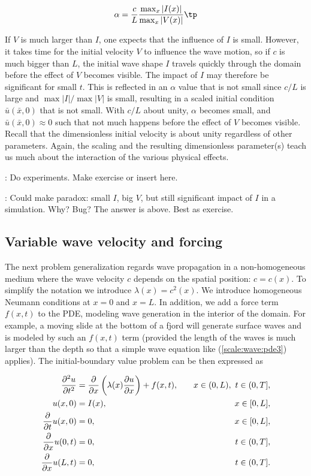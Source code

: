 \documentclass[graybox,envcountchap,sectrefs,final]{svmonodo}
\newcommand{\shortinlinecomment}[3]{{\color{red}{\bf #1}: #2}}
\newcommand{\longinlinecomment}[3]{{\color{red}{\bf #1}: #2}}
\begin{document}
\[ \alpha = \frac{c}{L}\frac{\max_x |I(x)|}{\max_x |V(x)|}\tp\]


If $V$ is much larger than $I$, one expects that the influence of $I$
is small. However, it takes time for the initial velocity $V$ to
influence the wave motion, so if $c$ is much bigger than $L$, the
initial wave shape $I$
travels quickly through the domain before the effect of $V$ becomes
visible. The impact of $I$ may therefore be significant for small $t$.
This is reflected in an
$\alpha$ value that is not small since $c/L$ is large and $\max |I|/\max |V|$
is small, resulting in a scaled initial condition $\bar u(\bar x,0)$
that is not small.
With $c/L$ about unity, $\alpha$ becomes small, and $\bar u(\bar x,0)
\approx 0$ such that not much happens before the effect of $V$ becomes
visible. Recall that the dimensionless initial velocity is about unity
regardless of other parameters.
Again, the scaling and the resulting dimensionless parameter(s)
teach us much about the interaction of the various physical effects.

\shortinlinecomment{hpl 12}{ Do experiments. Make exercise or insert here. }{ Do experiments. Make exercise }

\longinlinecomment{hpl 13}{ Could make paradox: small $I$, big $V$, but still significant impact of $I$ in a simulation. Why? Bug? The answer is above. Best as exercise. }{ Could make paradox: small }

\subsection{Variable wave velocity and forcing}
\label{scale:wave:pde2:cvar}

The next problem generalization regards wave propagation in
a non-homogeneous medium where the wave velocity $c$ depends on the
spatial position: $c=c(x)$. To simplify the notation we introduce
$\lambda (x) = c^2(x)$. We introduce homogeneous Neumann conditions
at $x=0$ and $x=L$. In addition, we add a force term $f(x,t)$
to the PDE, modeling wave generation in the interior of
the domain. For example, a moving slide at the bottom of a fjord
will generate surface waves and is modeled by such an $f(x,t)$ term
(provided the length of the waves is much larger than the depth so
that a simple wave equation like (\ref{scale:wave:pde3}) applies).
The initial-boundary value problem
can be then expressed as

\begin{align}
\frac{\partial^2 u}{\partial t^2} &=
\frac{\partial}{\partial x}\left(
\lambda(x) {\partial u\over\partial x}\right) + f(x,t),
\quad & x\in (0,L),\ t\in (0,T],
\label{scale:wave:pde3}\\ 
u(x,0) &= I(x),
\quad &x\in [0,L],
\label{scale:wave:pde3:ic:u}\\ 
{\partial\over\partial t}u(x,0) &= 0,
\quad & x\in [0,L],
\label{scale:wave:pde3:ic:ut}\\ 
\frac{\partial}{\partial x}u(0,t) & = 0,
\quad  &t\in (0,T],
\label{scale:wave:pde3:bc:0}\\ 
\frac{\partial}{\partial x}u(L,t) & = 0,
\quad  &t\in (0,T].
\label{scale:wave:pde3:bc:L}
\end{align}
\end{document}
